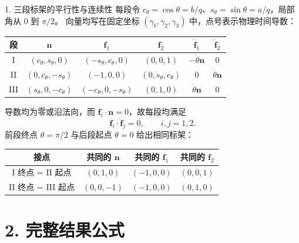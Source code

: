 \documentclass[aspectratio=169,11pt]{beamer}
\begin{document}
\begin{frame}[t]{1. 三段标架的平行性与连续性}
  \small
  \setlength{\abovedisplayskip}{4pt}\setlength{\belowdisplayskip}{4pt}
  每段令 $c_\theta=\cos\theta=b/q$、$s_\theta=\sin\theta=a/q$，局部角从 $0$ 到 $\pi/2$。
  向量均写在固定坐标 $(\gamma_b,\gamma_2,\gamma_3)$ 中，点号表示物理时间导数：
  \begin{center}
    \scriptsize\renewcommand{\arraystretch}{1.4}
    \setlength{\tabcolsep}{5pt}
    \begin{tabular}{cccccc}
      \toprule 段 & $\bm n$ & $\bm f_1$ & $\bm f_2$ & $\dot{\bm f}_1$ & $\dot{\bm f}_2$\\\midrule
      I & $(c_\theta,s_\theta,0)$ & $(-s_\theta,c_\theta,0)$ & $(0,0,1)$ & $-\dot\theta\bm n$ & $0$\\
      II & $(0,c_\theta,-s_\theta)$ & $(-1,0,0)$ & $(0,s_\theta,c_\theta)$ & $0$ & $\dot\theta\bm n$\\
      III & $(s_\theta,0,-c_\theta)$ & $(-c_\theta,0,-s_\theta)$ & $(0,1,0)$ & $\dot\theta\bm n$ & $0$\\\bottomrule
    \end{tabular}
  \end{center}
  导数均为零或沿法向，而 $\bm f_i\cdot\bm n=0$，故每段均满足
  \[
    \boxed{\bm f_i\cdot\dot{\bm f}_j=0,\qquad i,j=1,2.}
  \]
  前段终点 $\theta=\pi/2$ 与后段起点 $\theta=0$ 给出相同标架：
  \begin{center}
    \scriptsize\renewcommand{\arraystretch}{1.3}
    \begin{tabular}{cccc}
      \toprule 接点 & 共同的 $\bm n$ & 共同的 $\bm f_1$ & 共同的 $\bm f_2$\\\midrule
      I 终点 = II 起点 & $(0,1,0)$ & $(-1,0,0)$ & $(0,0,1)$\\
      II 终点 = III 起点 & $(0,0,-1)$ & $(-1,0,0)$ & $(0,1,0)$\\\bottomrule
    \end{tabular}
  \end{center}
\end{frame}

\section{2. 完整结果公式}
\end{document}
